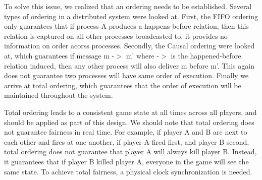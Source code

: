 To solve this issue, we realized that an ordering needs to be established. Several types of ordering in a distributed system were looked at. First, the FIFO ordering only guarantees that if process A produces a happens-before relation, then this relation is captured on all other processes broadcasted to, it provides no information on order acorss processes. Secondly, the Causal ordering were looked at, which guarantees if message m -$>$ m' where -$>$ is the happened-before relation induced, then any other process will also deliver m before m'. This again does not guarantee two processes will have same order of execution. Finally we arrive at total ordering, which guarantees that the order of execution will be maintained throughout the system.

Total ordering leads to a consistent game state at all times across all players, and should be applied as part of this design. We should note that total ordering does not guarantee fairness in real time. For example, if player A and B are next to each other and fires at one another, if player A fired first, and player B second, total ordering does not guarantee that player A will always kill player B. Instead, it guarantees that if player B killed player A, everyone in the game will see the same state. To achieve total fairness, a physical clock synchronization is needed.
